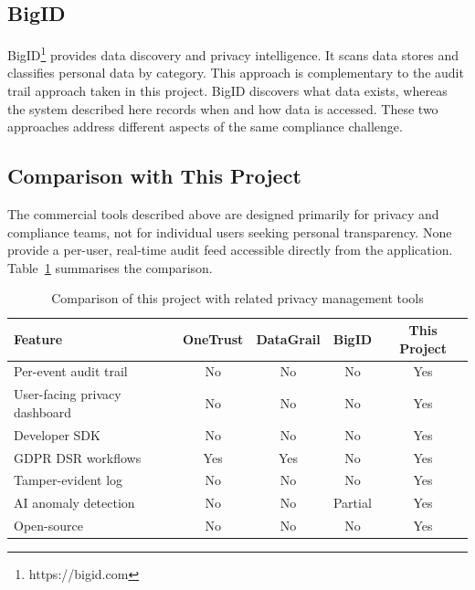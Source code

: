 \documentclass[a4paper,12pt,onecolumn]{report}
\begin{document}
\subsection{BigID}

BigID\footnote{\label{bigid}https://bigid.com} provides data discovery and privacy intelligence.
It scans data stores and classifies personal data by category.
This approach is complementary to the audit trail approach taken in this project.
BigID discovers what data exists, whereas the system described here records when and how data is accessed.
These two approaches address different aspects of the same compliance challenge.

\subsection{Comparison with This Project}

The commercial tools described above are designed primarily for privacy and compliance teams, not for individual users seeking personal transparency.
None provide a per-user, real-time audit feed accessible directly from the application.
Table~\ref{tab:related-work} summarises the comparison.

\begin{table}[H]
    \begin{center}
        \begin{tabular}{|l|c|c|c|c|}
            \hline
            \textbf{Feature} & \textbf{OneTrust} & \textbf{DataGrail} & \textbf{BigID} & \textbf{This Project} \\
            \hline
            Per-event audit trail & No & No & No & Yes \\
            \hline
            User-facing privacy dashboard & No & No & No & Yes \\
            \hline
            Developer SDK & No & No & No & Yes \\
            \hline
            GDPR DSR workflows & Yes & Yes & No & Yes \\
            \hline
            Tamper-evident log & No & No & No & Yes \\
            \hline
            AI anomaly detection & No & No & Partial & Yes \\
            \hline
            Open-source & No & No & No & Yes \\
            \hline
        \end{tabular}
    \end{center}
    \caption{Comparison of this project with related privacy management tools}
    \label{tab:related-work}
\end{table}%
\end{document}
